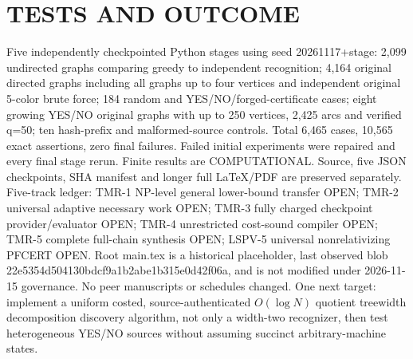 \documentclass[11pt]{article}
\begin{document}
\section{TESTS AND OUTCOME}
Five independently checkpointed Python stages using seed 20261117+stage: 2,099 undirected graphs comparing greedy to independent recognition; 4,164 original directed graphs including all graphs up to four vertices and independent original 5-color brute force; 184 random and YES/NO/forged-certificate cases; eight growing YES/NO original graphs with up to 250 vertices, 2,425 arcs and verified q=50; ten hash-prefix and malformed-source controls. Total 6,465 cases, 10,565 exact assertions, zero final failures. Failed initial experiments were repaired and every final stage rerun. Finite results are COMPUTATIONAL. Source, five JSON checkpoints, SHA manifest and longer full LaTeX/PDF are preserved separately.
Five-track ledger: TMR-1 NP-level general lower-bound transfer OPEN; TMR-2 universal adaptive necessary work OPEN; TMR-3 fully charged checkpoint provider/evaluator OPEN; TMR-4 unrestricted cost-sound compiler OPEN; TMR-5 complete full-chain synthesis OPEN; LSPV-5 universal nonrelativizing PFCERT OPEN. Root main.tex is a historical placeholder, last observed blob 22e5354d504130bdcf9a1b2abe1b315e0d42f06a, and is not modified under 2026-11-15 governance. No peer manuscripts or schedules changed.
One next target: implement a uniform costed, source-authenticated $O(\log N)$ quotient treewidth decomposition discovery algorithm, not only a width-two recognizer, then test heterogeneous YES/NO sources without assuming succinct arbitrary-machine states.
\end{document}
